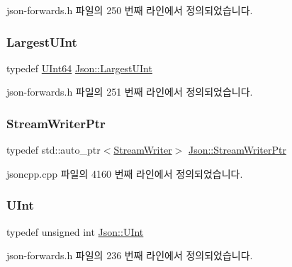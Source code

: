 json-\/forwards.\+h 파일의 250 번째 라인에서 정의되었습니다.

\mbox{\label{namespace_json_ae202ecad69725e23443f465e257456d0}} 
\subsubsection{\texorpdfstring{Largest\+U\+Int}{LargestUInt}}
{\footnotesize\ttfamily typedef \hyperlink{namespace_json_adf3fa5cb60c619e4f02315ad355e0ca1}{U\+Int64} \hyperlink{namespace_json_ae202ecad69725e23443f465e257456d0}{Json\+::\+Largest\+U\+Int}}



json-\/forwards.\+h 파일의 251 번째 라인에서 정의되었습니다.

\mbox{\label{namespace_json_a7132404aeebfc96d7c6ad2c66260afb5}} 
\subsubsection{\texorpdfstring{Stream\+Writer\+Ptr}{StreamWriterPtr}}
{\footnotesize\ttfamily typedef std\+::auto\+\_\+ptr$<$\hyperlink{class_json_1_1_stream_writer}{Stream\+Writer}$>$ \hyperlink{namespace_json_a7132404aeebfc96d7c6ad2c66260afb5}{Json\+::\+Stream\+Writer\+Ptr}}



jsoncpp.\+cpp 파일의 4160 번째 라인에서 정의되었습니다.

\mbox{\label{namespace_json_a800fb90eb6ee8d5d62b600c06f87f7d4}} 
\subsubsection{\texorpdfstring{U\+Int}{UInt}}
{\footnotesize\ttfamily typedef unsigned int \hyperlink{namespace_json_a800fb90eb6ee8d5d62b600c06f87f7d4}{Json\+::\+U\+Int}}



json-\/forwards.\+h 파일의 236 번째 라인에서 정의되었습니다.

\mbox{\label{namespace_json_adf3fa5cb60c619e4f02315ad355e0ca1}} 
